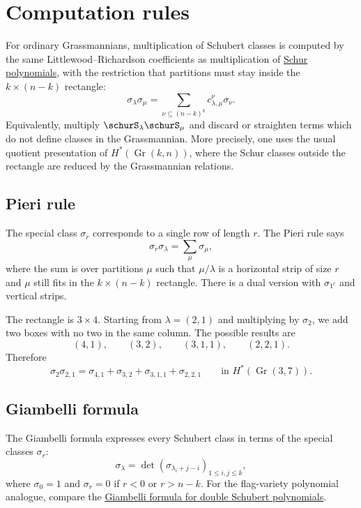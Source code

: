 \section[schubertCalculusComputationRules]{Computation rules}

For ordinary Grassmannians, multiplication of Schubert classes is computed by
the same Littlewood--Richardson coefficients as multiplication of
\hyperref[schurS]{Schur polynomials}, with the restriction that partitions must
stay inside the $k\times(n-k)$ rectangle:
\[
  \sigma_\lambda\sigma_\mu
  =
  \sum_{\nu\subseteq(n-k)^k}
  c_{\lambda,\mu}^{\nu}\sigma_\nu.
\]
Equivalently, multiply $\schurS_\lambda\schurS_\mu$ and discard or straighten
terms which do not define classes in the Grassmannian.  More precisely, one
uses the usual quotient presentation of $H^*(\operatorname{Gr}(k,n))$, where
the Schur classes outside the rectangle are reduced by the Grassmannian
relations.


\subsection[schubertCalculusPieri]{Pieri rule}

The special class $\sigma_r$ corresponds to a single row of length $r$.  The
Pieri rule says
\[
  \sigma_r\sigma_\lambda
  =
  \sum_\mu \sigma_\mu,
\]
where the sum is over partitions $\mu$ such that $\mu/\lambda$ is a horizontal
strip of size $r$ and $\mu$ still fits in the $k\times(n-k)$ rectangle.
There is a dual version with $\sigma_{1^r}$ and vertical strips.

\begin{example*}
The rectangle is $3\times4$.  Starting from $\lambda=(2,1)$ and multiplying
by $\sigma_2$, we add two boxes with no two in the same column.  The possible
results are
\[
  (4,1),\qquad (3,2),\qquad (3,1,1),\qquad (2,2,1).
\]
Therefore
\[
  \sigma_2\sigma_{2,1}
  =
  \sigma_{4,1}+\sigma_{3,2}+\sigma_{3,1,1}+\sigma_{2,2,1}
  \qquad\text{in } H^*(\operatorname{Gr}(3,7)).
\]
\end{example*}


\subsection[schubertCalculusGiambelli]{Giambelli formula}

The Giambelli formula expresses every Schubert class in terms of the special
classes $\sigma_r$:
\[
  \sigma_\lambda
  =
  \det\left(\sigma_{\lambda_i+j-i}\right)_{1\leq i,j\leq k},
\]
where $\sigma_0=1$ and $\sigma_r=0$ if $r<0$ or $r>n-k$.
For the flag-variety polynomial analogue, compare the
\hyperref[schubertDoubleGiambelliFormula]{Giambelli formula for double
Schubert polynomials}.

